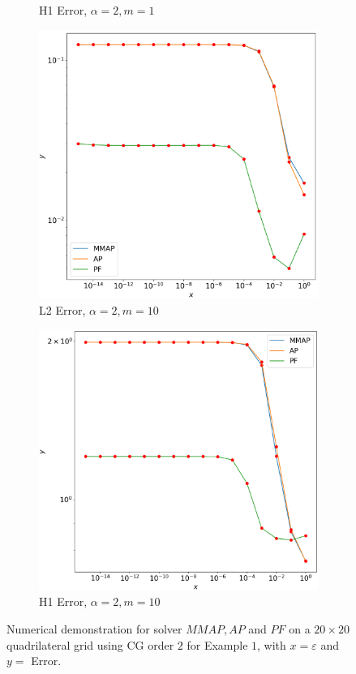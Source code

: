 \documentclass[12pt]{ociamthesis}
\begin{document}
\begin{figure}[H]
\begin{subfigure}{0.44\textwidth}
     \caption{H1 Error, $\alpha=2, m=1$}
 \end{subfigure}
 \begin{subfigure}{0.44\textwidth}
     \includegraphics[width=\textwidth]{Pics/LHSims/E1c_MMAP_AP_PFL2.png}
     \caption{L2 Error, $\alpha=2, m=10$}
 \end{subfigure}
 \hfill
 \begin{subfigure}{0.44\textwidth}
     \includegraphics[width=\textwidth]{Pics/LHSims/E1c_MMAP_AP_PFH1.png}
     \caption{H1 Error, $\alpha=2, m=10$}
 \end{subfigure}
 \caption{Numerical demonstration for solver $MMAP, AP$ and $PF$ on a $20\times 20$ quadrilateral grid using CG order $2$ for Example $1$, with $x=\varepsilon$ and $y=$ Error.} \label{E1_LH_PF}
\end{figure}
\end{document}
